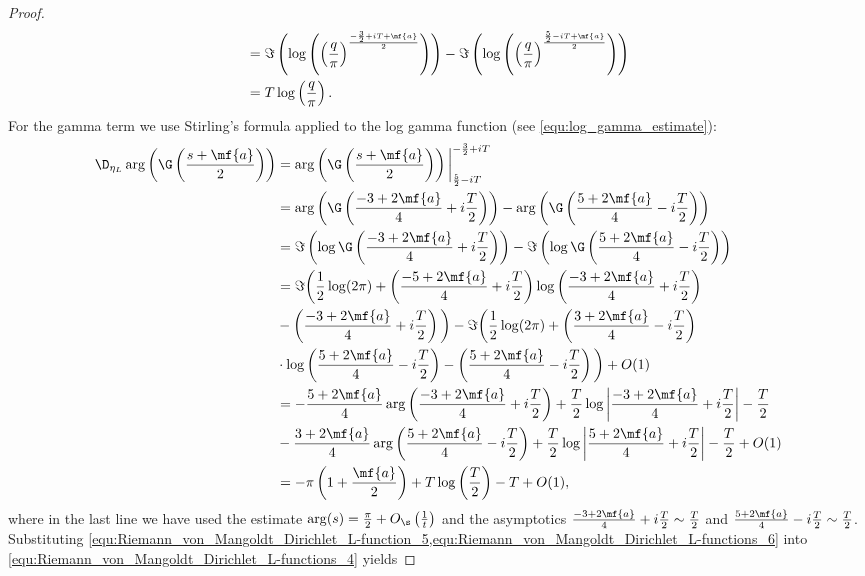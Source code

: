 \begin{proof}
\begin{equation}
\begin{aligned}
            &= \Im\left(\log\left(\left(\frac{q}{\pi}\right)^{\frac{-\frac{3}{2}+iT+\mf{a}}{2}}\right)\right)-\Im\left(\log\left(\left(\frac{q}{\pi}\right)^{\frac{\frac{5}{2}-iT+\mf{a}}{2}}\right)\right) \\
            &= T\log\left(\frac{q}{\pi}\right).
          \end{aligned}            
        \end{equation}
        For the gamma term we use Stirling's formula applied to the log gamma function (see \cref{equ:log_gamma_estimate}):
        \begin{equation}\label{equ:Riemann_von_Mangoldt_Dirichlet_L-functions_6}
          \begin{aligned}
            \D_{\eta_{L}}\arg\left(\G\left(\frac{s+\mf{a}}{2}\right)\right) &= \arg\left(\G\left(\frac{s+\mf{a}}{2}\right)\right)\bigg|_{\frac{5}{2}-iT}^{-\frac{3}{2}+iT} \\
            &= \arg\left(\G\left(\frac{-3+2\mf{a}}{4}+i\frac{T}{2}\right)\right)-\arg\left(\G\left(\frac{5+2\mf{a}}{4}-i\frac{T}{2}\right)\right) \\
            &= \Im\left(\log\G\left(\frac{-3+2\mf{a}}{4}+i\frac{T}{2}\right)\right)-\Im\left(\log\G\left(\frac{5+2\mf{a}}{4}-i\frac{T}{2}\right)\right) \\
            &= \Im\bigg(\frac{1}{2}\log(2\pi)+\left(\frac{-5+2\mf{a}}{4}+i\frac{T}{2}\right)\log\left(\frac{-3+2\mf{a}}{4}+i\frac{T}{2}\right) \\
            &- \left(\frac{-3+2\mf{a}}{4}+i\frac{T}{2}\right)\bigg)-\Im\bigg(\frac{1}{2}\log(2\pi)+\left(\frac{3+2\mf{a}}{4}-i\frac{T}{2}\right) \\
            &\cdot \log\left(\frac{5+2\mf{a}}{4}-i\frac{T}{2}\right)-\left(\frac{5+2\mf{a}}{4}-i\frac{T}{2}\right)\bigg)+O(1) \\
            &= -\frac{5+2\mf{a}}{4}\arg\left(\frac{-3+2\mf{a}}{4}+i\frac{T}{2}\right)+\frac{T}{2}\log\left|\frac{-3+2\mf{a}}{4}+i\frac{T}{2}\right|-\frac{T}{2} \\
            &- \frac{3+2\mf{a}}{4}\arg\left(\frac{5+2\mf{a}}{4}-i\frac{T}{2}\right)+\frac{T}{2}\log\left|\frac{5+2\mf{a}}{4}+i\frac{T}{2}\right|-\frac{T}{2}+O(1) \\
            &= -\pi\left(1+\frac{\mf{a}}{2}\right)+T\log\left(\frac{T}{2}\right)-T+O(1),
          \end{aligned}
        \end{equation}
        where in the last line we have used the estimate $\arg(s) = \frac{\pi}{2}+O_{\s}\left(\frac{1}{t}\right)$ and the asymptotics $\frac{-3+2\mf{a}}{4}+i\frac{T}{2} \sim \frac{T}{2}$ and $\frac{5+2\mf{a}}{4}-i\frac{T}{2} \sim \frac{T}{2}$. Substituting \cref{equ:Riemann_von_Mangoldt_Dirichlet_L-function_5,equ:Riemann_von_Mangoldt_Dirichlet_L-functions_6} into \cref{equ:Riemann_von_Mangoldt_Dirichlet_L-functions_4} yields

\end{proof}
